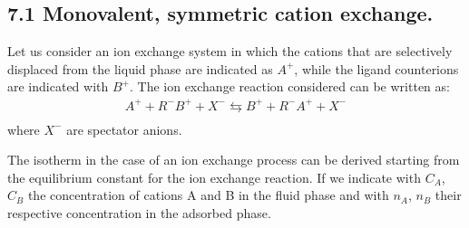 \documentclass[letterpaper,10pt,english]{jupyterBook}
\begin{document}
\subsection{7.1 Monovalent, symmetric cation exchange.}
\label{\detokenize{Ion_Exchange:monovalent-symmetric-cation-exchange}}
\sphinxAtStartPar
Let us consider an ion exchange system in which the cations that are selectively displaced from the liquid phase are indicated as \(A^+\), while the ligand counterions are indicated with \(B^+\).
The ion exchange reaction considered can be written as:
\begin{equation*}
\begin{split}
A^+ + R^-B^+ + X^- \leftrightarrows B^+ + R^-A^+ + X^- \\
\end{split}
\end{equation*}
\sphinxAtStartPar
where \(X^-\) are spectator anions.

\sphinxAtStartPar
The isotherm in the case of an ion exchange process can be derived starting from the equilibrium constant for the ion exchange reaction.
If we indicate with \(C_A\), \(C_B\) the concentration of cations A and B in the fluid phase and with \(n_A\), \(n_B\) their respective concentration in the adsorbed phase.
\end{document}
